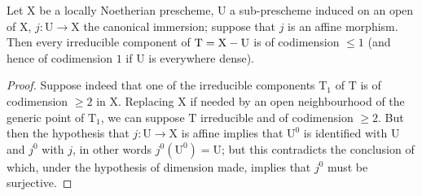 \begin{corollary}[21.12.7]
\label{IV.21.12.7}
Let $\mathrm{X}$ be a locally Noetherian prescheme, $\mathrm{U}$ a sub-prescheme induced on an open of $\mathrm{X}$, $j:\mathrm{U}\to\mathrm{X}$ the canonical immersion; suppose that $j$ is an \textup{affine} morphism.
Then every irreducible component of $\mathrm{T}=\mathrm{X}-\mathrm{U}$ is of codimension $\leq 1$ (and hence of codimension $1$ if $\mathrm{U}$ is everywhere dense).
\end{corollary}

\begin{proof}
Suppose indeed that one of the irreducible components $\mathrm{T}_1$ of $\mathrm{T}$ is of codimension $\geq 2$ in $\mathrm{X}$.
Replacing $\mathrm{X}$ if needed by an open neighbourhood of the generic point of $\mathrm{T}_1$, we can suppose $\mathrm{T}$ irreducible and of codimension $\geq 2$.
But then the hypothesis
that $j:\mathrm{U}\to\mathrm{X}$ is affine implies that $\mathrm{U}^0$ is identified with $\mathrm{U}$ and $j^0$ with $j$, in other words $j^0(\mathrm{U}^0)=\mathrm{U}$; but this contradicts the conclusion of  which, under the hypothesis of dimension made, implies that $j^0$ must be surjective.
\end{proof}

